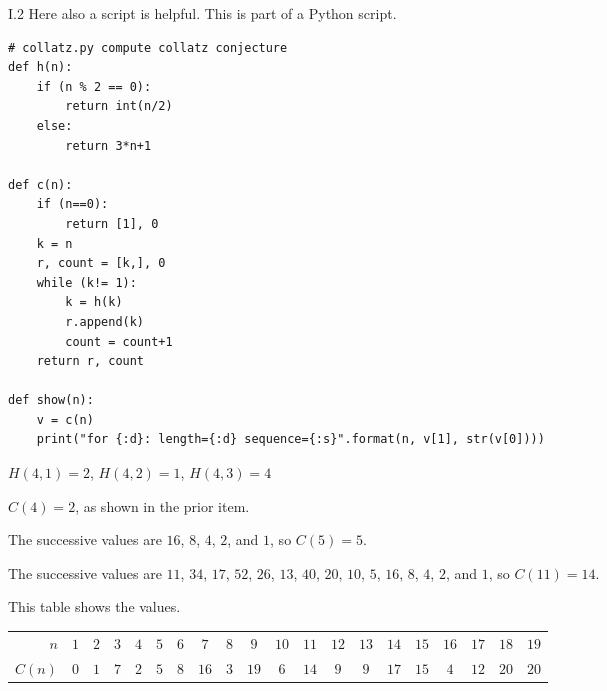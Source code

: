 %
%
%
%
\begin{ans}{I.2}
Here also a script is helpful.
This is part of a Python script.
\begin{lstlisting}
# collatz.py compute collatz conjecture
def h(n):
    if (n % 2 == 0):
        return int(n/2)
    else:
        return 3*n+1

def c(n):
    if (n==0):
        return [1], 0
    k = n
    r, count = [k,], 0
    while (k!= 1):
        k = h(k)
        r.append(k)
        count = count+1
    return r, count

def show(n):
    v = c(n)
    print("for {:d}: length={:d} sequence={:s}".format(n, v[1], str(v[0])))
\end{lstlisting}
\begin{exparts}
\item $H(4,1)=2$, $H(4,2)=1$, $H(4,3)=4$
\item $C(4)=2$, as shown in the prior item.
\item The successive values are $16$, $8$, $4$, $2$, and $1$,
 so $C(5)=5$.
\item The successive values are
  $11$, $34$, $17$, $52$, $26$, $13$, $40$, $20$, $10$, $5$, $16$,
  $8$, $4$, $2$, and $1$, so $C(11)=14$.
\item This table shows the values.
\begin{center}
\begin{tabular}{r|*{19}{c}}
 $n$    &$1$ &$2$ &$3$ &$4$ &$5$ &$6$ &$7$ &$8$ &$9$ &$10$
          &$11$ &$12$ &$13$ &$14$ &$15$ &$16$ &$17$ &$18$ &$19$ \\ \cline{2-20}
 $C(n)$ &$0$ &$1$ &$7$ &$2$ &$5$ &$8$ &$16$ &$3$ &$19$ &$6$
          &$14$ &$9$  &$9$ &$17$ &$15$ &$4$ &$12$ &$20$ &$20$
\end{tabular}
\end{center}
\end{exparts}
\end{ans}
%
